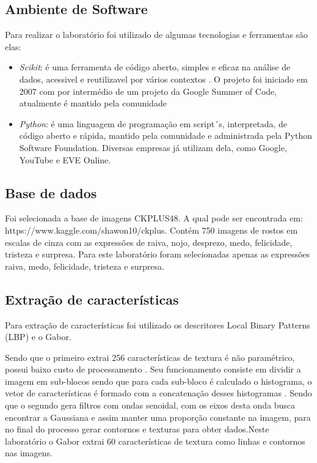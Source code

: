 \subsection{Ambiente de Software}
Para realizar o laboratório foi utilizado de algumas tecnologias e ferramentas são elas: 
\begin{itemize}
	\item \textit{Scikit}: é uma ferramenta de código aberto, simples e eficaz na análise de dados, acessivel e reutilizavel por vários contextos \cite{scikit-learn}. O projeto foi iniciado em 2007 com por intermédio de um projeto da Google Summer of Code, atualmente é mantido pela comunidade
	\item \textit{Python}: é uma linguagem de programação em script´s, interpretada, de código aberto e rápida, mantido pela comunidade e administrada pela Python Software Foundation. Diversas empresas já utilizam dela, como Google, YouTube e EVE Online.
\end{itemize}

\subsection{Base de dados}
Foi selecionada a base de imagens CKPLUS48. A qual pode ser encontrada em: https://www.kaggle.com/shawon10/ckplus. Contém 750 imagens de rostos em escalas de cinza com as expressões de raiva, nojo, desprezo, medo, felicidade, tristeza e surpresa. Para este laboratório foram selecionadas apenas as expressões raiva, medo, felicidade, tristeza e surpresa.

\subsection{Extração de características}

Para extração de características foi utilizado os descritores Local Binary Patterns (LBP) e o Gabor.

Sendo que o primeiro extrai 256 características de textura é não paramétrico, possui baixo custo de processamento \cite{rajan:19}. Seu funcionamento consiste em dividir a imagem em sub-blocos sendo que para cada sub-bloco é calculado o histograma, o vetor de características é formado com a concatenação desses histogramas \cite{rajan:19}.
Sendo que o segundo gera filtros com ondas senoidal, com os eixos desta onda busca encontrar a Gaussiana e assim manter uma proporção constante na imagem, para no final do processo gerar contornos e texturas para obter dados\cite{lima:2016}.Neste laboratório o Gabor extrai 60 características de textura como linhas e contornos nas imagens.
 
